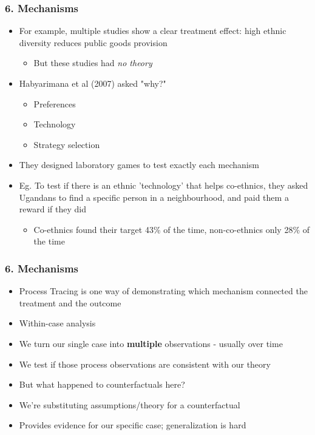 \documentclass[xcolor=x11names,compress]{beamer}\usepackage[]{graphicx}\usepackage[]{color}
\renewcommand{\(}{\begin{columns}}
\renewcommand{\)}{\end{columns}}
\newcommand{\<}[1]{\begin{column}{#1}}
\renewcommand{\>}{\end{column}}
\begin{document}
\begin{frame}
\frametitle{6. Mechanisms}
\begin{itemize}
\item For example, multiple studies show a clear treatment effect: high ethnic diversity reduces public goods provision
\pause
\begin{itemize}
\item But these studies had \textit{no theory}
\pause
\end{itemize}
\item Habyarimana et al (2007) asked "why?"
\pause
\begin{itemize}
\item Preferences
\item Technology
\item Strategy selection
\pause
\end{itemize}
\item They designed laboratory games to test exactly each mechanism
\pause
\item Eg. To test if there is an ethnic 'technology' that helps co-ethnics, they asked Ugandans to find a specific person in a neighbourhood, and paid them a reward if they did
\pause
\begin{itemize}
\item Co-ethnics found their target 43\% of the time, non-co-ethnics only 28\% of the time
\end{itemize}
\end{itemize}
\end{frame}

\begin{frame}
\frametitle{6. Mechanisms}
\begin{itemize}
\item Process Tracing is one way of demonstrating which mechanism connected the treatment and the outcome 
\pause
\item Within-case analysis
\pause
\item We turn our single case into \textbf{multiple} observations - usually over time
\pause
\item We test if those process observations are consistent with our theory
\pause
\item But what happened to counterfactuals here? 
\pause
\item We’re substituting assumptions/theory for a counterfactual
\pause
\item Provides evidence for our specific case; generalization is hard
\end{itemize}
\end{frame}
\end{document}
